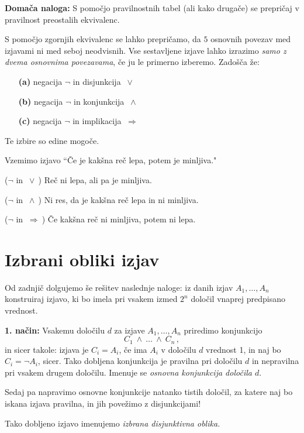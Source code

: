 \documentclass[11pt,paper=b5,footinclude,headinclude]{scrbook} %
\newcounter{example}
\def\ali {{~\vee~}}
\def\inn {{~\wedge~}}
\def\sledi {{~\Rightarrow~}}
\begin{document}
\textbf{ Domača naloga:} S pomočjo pravilnostnih tabel (ali kako drugače) se prepričaj v pravilnost
preostalih ekvivalenc.

\bigskip
S pomočjo zgornjih ekvivalenc se lahko prepričamo, da $5$ osnovnih povezav med izjavami ni med seboj neodvisnih.
Vse sestavljene izjave lahko izrazimo {\em samo z dvema osnovnima povezavama}, če ju le primerno izberemo.
Zadošča že:
\begin{enumerate}
  \item[\textbf{ (a)}] negacija $\neg$ in  disjunkcija $\ali$
  \item[\textbf{ (b)}] negacija $\neg$ in konjunkcija $\inn$
  \item[\textbf{ (c)}] negacija $\neg$ in implikacija $\sledi$
\end{enumerate}
Te izbire so edine mogoče.

\medskip
\begin{example*}

Vzemimo izjavo ``Če je kakšna reč lepa, potem je minljiva."

($\neg$ in $\ali$) Reč ni lepa, ali pa je minljiva.

($\neg$ in $\inn$) Ni res, da je kakšna reč lepa in ni minljiva.

($\neg$ in $\sledi$) Če kakšna reč ni minljiva, potem ni lepa.\end{example*}


\section{Izbrani obliki izjav}

Od zadnjič dolgujemo še rešitev naslednje naloge: iz danih izjav $A_1,\ldots, A_n$ konstruiraj izjavo,
ki bo imela pri vsakem izmed $2^n$ določil vnaprej predpisano vrednost.

\textbf{ 1. način:}
Vsakemu določilu $d$ za izjave $A_1,\ldots, A_n$ priredimo konjunkcijo
$$C_1\inn \ldots \inn C_n\,,$$
in sicer takole: izjava je $C_i = A_i$, če ima $A_i$ v določilu $d$ vrednost 1, in naj bo
$C_i = \neg A_i$, sicer.
Tako dobljena konjunkcija je pravilna pri določilu $d$ in nepravilna pri vsakem drugem določilu.
Imenuje se {\em osnovna konjunkcija določila $d$}.

Sedaj pa napravimo osnovne konjunkcije natanko tistih določil, za katere naj
bo iskana izjava pravilna, in jih povežimo z disjunkcijami!

Tako dobljeno izjavo imenujemo {\em izbrana disjunktivna oblika.}
\end{document}
